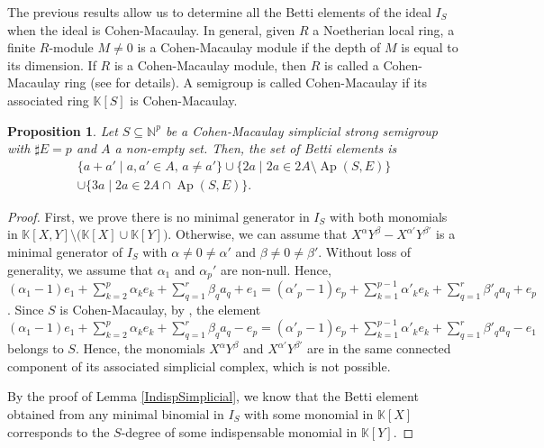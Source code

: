 \documentclass[a4paper,11pt]{article}
\newtheorem{proposition}[theorem]{Proposition}
\def\N{\mathbb{N}}
\def\k{\mathbb{K}}
\def\Ap{\operatorname{Ap}}
\begin{document}
{The previous results allow us to determine all the Betti elements of the ideal $I_S$ when the ideal is Cohen-Macaulay. In general, given $R$ a Noetherian local ring, a finite $R$-module $M\neq0$ is a Cohen-Macaulay module if the depth of $M$ is equal to its dimension.
If $R$ is a Cohen-Macaulay module, then $ R$ is called a Cohen-Macaulay ring (see \cite{libro-C-M} for details). A semigroup is called Cohen-Macaulay if its associated ring $\k[S]$ is Cohen-Macaulay.

\begin{proposition}\label{CM_simplicial_strong}
Let $S\subseteq \N^p$ be a Cohen-Macaulay simplicial strong semigroup with $\sharp E= p$ and $A$ a non-empty set. Then, the set of Betti elements is
\begin{multline*}
    \{a+a'\mid a,a'\in A,\, a\neq a'\}\cup \{2a\mid 2a\in 2A\setminus \Ap (S,E)\} \\\cup \{3a\mid 2a\in 2A\cap\Ap (S,E)\}.
\end{multline*}
\end{proposition}

\begin{proof}
First, we prove there is no minimal generator in $I_S$ with both monomials in $\k[X,Y]\setminus \big(\k[X]\cup \k[Y]\big)$. Otherwise, we can assume that $X^{\alpha}Y^{\beta}-X^{\alpha'}Y^{\beta'}$ is a minimal generator of $I_S$ with $\alpha\neq 0 \neq \alpha'$ and $\beta\neq 0 \neq \beta'$. Without loss of generality, we assume that $\alpha_1$ and $\alpha_p'$ are non-null.
Hence, $(\alpha_1-1) e_1+\sum_{k=2}^p \alpha_ke_k+ \sum _{q=1}^r\beta_q a_q+e_1= (\alpha'_p-1) e_p+\sum_{k=1}^{p-1} \alpha'_ke_k+\sum _{q=1}^r\beta'_q a_q+e_p$. Since $S$ is Cohen-Macaulay, by \cite[Theorem 2.6]{Goto}, the element $(\alpha_1-1) e_1+\sum_{k=2}^p \alpha_ke_k+ \sum _{q=1}^r\beta_q a_q-e_p= (\alpha'_p-1) e_p+\sum_{k=1}^{p-1} \alpha'_ke_k+\sum _{q=1}^r\beta'_q a_q-e_1$ belongs to $S$. Hence, the monomials $X^{\alpha}Y^{\beta}$ and $X^{\alpha'}Y^{\beta'}$ are in the same connected component of its associated simplicial complex, which is not possible.

By the proof of Lemma \ref{IndispSimplicial}, we know that the Betti element obtained from any minimal binomial in $I_S$ with some monomial in $\k[X]$ corresponds to the $S$-degree of some indispensable monomial in $\k[Y]$.


\end{proof}}
\end{document}
